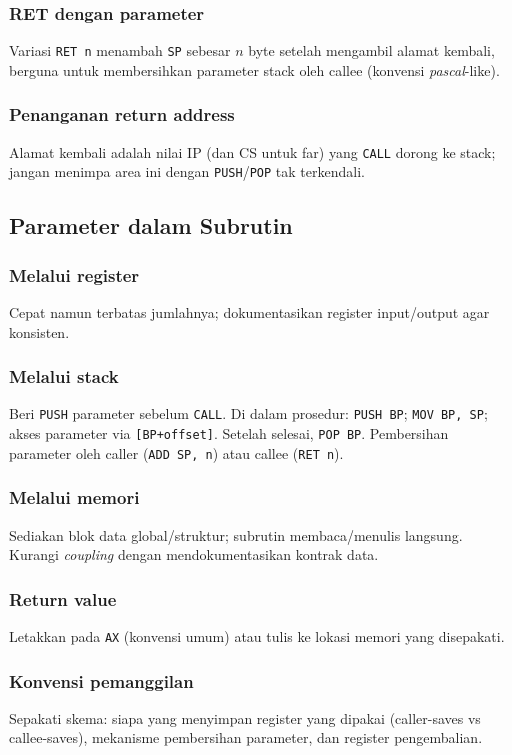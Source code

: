 \documentclass[../main.tex]{subfiles}
\begin{document}
\subsubsection{RET dengan parameter}
Variasi \texttt{RET n} menambah \texttt{SP} sebesar \(n\) byte setelah mengambil alamat kembali, berguna untuk membersihkan parameter stack oleh callee (konvensi \textit{pascal}-like).

\subsubsection{Penanganan return address}
Alamat kembali adalah nilai IP (dan CS untuk far) yang \texttt{CALL} dorong ke stack; jangan menimpa area ini dengan \texttt{PUSH}/\texttt{POP} tak terkendali.

\subsection{Parameter dalam Subrutin}
\subsubsection{Melalui register}
Cepat namun terbatas jumlahnya; dokumentasikan register input/output agar konsisten.

\subsubsection{Melalui stack}
Beri \texttt{PUSH} parameter sebelum \texttt{CALL}. Di dalam prosedur: \texttt{PUSH BP}; \texttt{MOV BP, SP}; akses parameter via \texttt{[BP+offset]}. Setelah selesai, \texttt{POP BP}. Pembersihan parameter oleh caller (\texttt{ADD SP, n}) atau callee (\texttt{RET n}).

\subsubsection{Melalui memori}
Sediakan blok data global/struktur; subrutin membaca/menulis langsung. Kurangi \textit{coupling} dengan mendokumentasikan kontrak data.

\subsubsection{Return value}
Letakkan pada \texttt{AX} (konvensi umum) atau tulis ke lokasi memori yang disepakati.

\subsubsection{Konvensi pemanggilan}
Sepakati skema: siapa yang menyimpan register yang dipakai (caller-saves vs callee-saves), mekanisme pembersihan parameter, dan register pengembalian.
\end{document}
